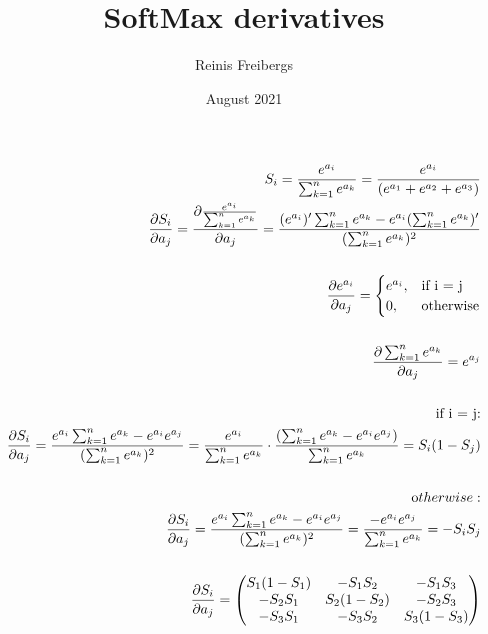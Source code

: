 \documentclass{article}
\title{SoftMax derivatives}
\author{Reinis Freibergs}
\date{August 2021}
\begin{document}
\maketitle

\begin{equation*}
\begin{aligned}
    S_{i} = \frac{e^{a_{i}}}{\sum_{k=1}^{n}e^{a_{k}}}  =  \frac{e^{a_{i}}}{(e^{a_{1}} + e^{a_{2}} + e^{a_{3}})} \\
    \frac{\partial S_{i}}{\partial a_{j}} = \frac{\partial\frac{e^{a_{i}}}{\sum_{k=1}^{n}e^{a_{k}}}}{\partial a_{j}} = \frac{(e^{a_{i}})' \sum_{k=1}^{n}e^{a_{k}}  -  e^{a_{i}}  (\sum_{k=1}^{n}e^{a_{k}})' 
    }
    {   (\sum_{k=1}^{n}e^{a_{k}})^{2}    }\\
    \\
    \frac {\partial e^{a_{i}} } {\partial a_{j} } = 
    \begin{cases}
        e^{a_{i}}, & \text{if i = j}\\
        0, & \text{otherwise}
    \end{cases}\\
    \\
    \frac{ \partial \sum_{k=1}^{n}e^{a_{k}} }{ \partial a_{j} } = e^{a_j}\\
    \\
    \text{ if i = j:}\\
    \frac{\partial S_{i}}{\partial a_{j}} = \frac { e^{a_i} \sum_{k=1}^{n}e^{a_{k}} - e^{a_i} e^{a_j} } { (\sum_{k=1}^{n}e^{a_{k}})^{2}  } = \frac{e^{a_i}  }  {\sum_{k=1}^{n}e^{a_{k}}} \cdot
    \frac{ (\sum_{k=1}^{n}e^{a_{k}} - e^{a_i} e^{a_{j}} ) } { \sum_{k=1}^{n}e^{a_{k}} } = S_i(1 - S_j)\\
    \\
    \text otherwise:\\
    \frac{\partial S_{i}}{\partial a_{j}} = \frac { e^{a_i} \sum_{k=1}^{n}e^{a_{k}} - e^{a_i} e^{a_j} } { (\sum_{k=1}^{n}e^{a_{k}})^{2}  } = \frac{ - e^{a_i} e^{a_j} } { \sum_{k=1}^{n}e^{a_{k}} } = -S_i S_j\\
    \\
    \frac{\partial S_{i}}{\partial a_{j}} = \begin{pmatrix}
    S_1(1-S_1) & -S_1S_2 & -S_1S_3\\
    -S_2S_1 & S_2(1-S_2) & -S_2S_3\\
    -S_3S_1 & -S_3S_2 & S_3(1-S_3)
    \end{pmatrix}
\end{aligned}
\end{equation*}
\end{document}
